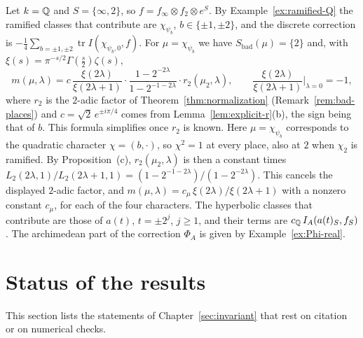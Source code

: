 \begin{example}\label{ex:itf-Q}
Let $k=\mathbb{Q}$ and $S=\{\infty,2\}$, so $f=f_\infty\otimes f_2\otimes e^S$.
By Example~\ref{ex:ramified-Q} the ramified classes that contribute are
$\chi_{\psi_b}$, $b\in\{\pm1,\pm2\}$, and the discrete correction is
$-\frac14\sum_{b=\pm1,\pm2}\operatorname{tr}I(\chi_{\psi_b,0},f)$. For
$\mu=\chi_{\psi_b}$ we have $S_{\mathrm{bad}}(\mu)=\{2\}$ and, with
$\xi(s)=\pi^{-s/2}\Gamma(\frac s2)\zeta(s)$,
\[
m(\mu,\lambda)=c\,\frac{\xi(2\lambda)}{\xi(2\lambda+1)}\cdot
\frac{1-2^{-2\lambda}}{1-2^{-1-2\lambda}}\cdot r_2(\mu_2,\lambda),\qquad
\frac{\xi(2\lambda)}{\xi(2\lambda+1)}\Big|_{\lambda=0}=-1,
\]
where $r_2$ is the $2$-adic factor of Theorem~\ref{thm:normalization}
(Remark~\ref{rem:bad-places}) and $c=\sqrt2\,e^{\pm i\pi/4}$ comes from
Lemma~\ref{lem:explicit-r}(b), the sign being that of $b$. This formula
simplifies once $r_2$ is known. Here $\mu=\chi_{\psi_b}$ corresponds to
the quadratic character $\chi=(b,\cdot)$, so $\chi^2=1$ at every place,
also at $2$ when $\chi_2$ is ramified. By
Proposition~\normref{}(c), $r_2(\mu_2,\lambda)$ is then a constant times
$L_2(2\lambda,1)/L_2(2\lambda+1,1)=(1-2^{-1-2\lambda})/(1-2^{-2\lambda})$.
This cancels the displayed $2$-adic factor, and
$m(\mu,\lambda)=c_\mu\,\xi(2\lambda)/\xi(2\lambda+1)$ with a nonzero
constant $c_\mu$, for each of the four characters. The
hyperbolic classes that contribute are those of $a(t)$, $t=\pm2^j$,
$j\ge1$, and their terms are $c_{\mathbb{Q}}\,I_A(a(t)_S,f_S)$. The archimedean part of the correction $\Phi_A$ is
given by Example~\ref{ex:Phi-real}.
\end{example}

\section{Status of the results}\label{sec:status6}

This section lists the statements of Chapter~\ref{sec:invariant}
that rest on citation or on numerical checks.


